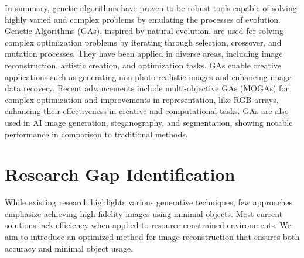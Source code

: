 \documentclass[10pt, conference]{IEEEtran}
\begin{document}
In summary, genetic algorithms have proven to be robust tools capable of solving highly varied and complex problems by emulating the processes of evolution.
Genetic Algorithms (GAs), inspired by natural evolution, are used for solving complex optimization problems by iterating through selection, crossover, and mutation processes. They have been applied in diverse areas, including image reconstruction, artistic creation, and optimization tasks. GAs enable creative applications such as generating non-photo-realistic images and enhancing image data recovery. Recent advancements include multi-objective GAs (MOGAs) for complex optimization and improvements in representation, like RGB arrays, enhancing their effectiveness in creative and computational tasks. GAs are also used in AI image generation, steganography, and segmentation, showing notable performance in comparison to traditional methods.

\section{Research Gap Identification}
While existing research highlights various generative techniques, few approaches emphasize achieving high-fidelity images using minimal objects. Most current solutions lack efficiency when applied to resource-constrained environments. We aim to introduce an optimized method for image reconstruction that ensures both accuracy and minimal object usage.
\end{document}
